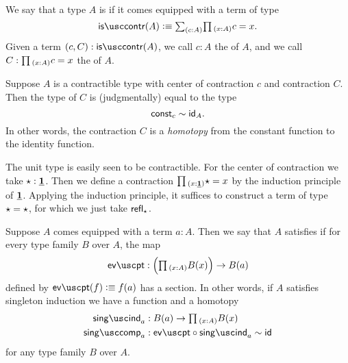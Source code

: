 \begin{defn}
  We say that a type $A$ is  if it comes equipped with a term of type
  \begin{equation*}
    \iscontr(A) \defeq \sm{c:A}\prd{x:A}c=x.
  \end{equation*}
  Given a term $(c,C):\iscontr(A)$, we call $c:A$ the  of $A$, and we call $C:\prd{x:A}c=x$ the  of $A$.
\end{defn}

\begin{rmk}
Suppose $A$ is a contractible type with center of contraction $c$ and contraction $C$. Then the type of $C$ is (judgmentally) equal to the type
\begin{equation*}
\mathsf{const}_c\htpy\idfunc[A].
\end{equation*}
In other words, the contraction $C$ is a \emph{homotopy} from the constant function to the identity function.
\end{rmk}

\begin{eg}
  The unit type is easily seen to be contractible. For the center of contraction we take $\ttt:\unit$. Then we define a contraction $\prd{x:\unit}\ttt=x$ by the induction principle of $\unit$. Applying the induction principle, it suffices to construct a term of type $\ttt = \ttt$, for which we just take $\refl{\ttt}$.
\end{eg}

\begin{defn}
  Suppose $A$ comes equipped with a term $a:A$. Then we say that $A$ satisfies  if for every type family $B$ over $A$, the map
  \begin{equation*}
    \evpt:\Big(\prd{x:A}B(x)\Big)\to B(a)
  \end{equation*}
  defined by $\evpt(f)\defeq f(a)$ has a section. In other words, if $A$ satisfies singleton induction we have a function and a homotopy
  \begin{align*}
    \singind_{a} & : B(a)\to \prd{x:A}B(x) \\
    \singcomp_{a} & : \evpt\circ \singind_{a} \htpy \idfunc
  \end{align*}
  for any type family $B$ over $A$.
\end{defn}

